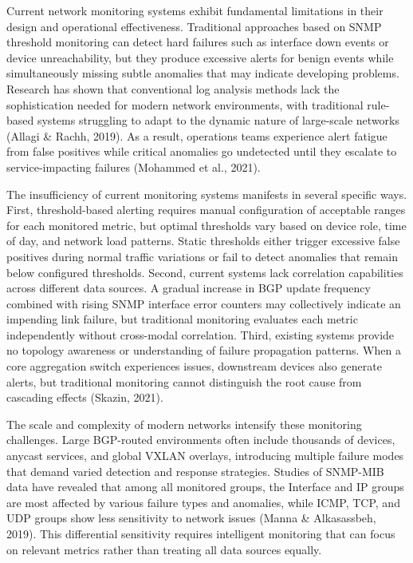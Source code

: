 \documentclass[11pt]{article}
\begin{document}
Current network monitoring systems exhibit fundamental limitations in their design and operational effectiveness. Traditional approaches based on SNMP threshold monitoring can detect hard failures such as interface down events or device unreachability, but they produce excessive alerts for benign events while simultaneously missing subtle anomalies that may indicate developing problems. Research has shown that conventional log analysis methods lack the sophistication needed for modern network environments, with traditional rule-based systems struggling to adapt to the dynamic nature of large-scale networks (Allagi \& Rachh, 2019). As a result, operations teams experience alert fatigue from false positives while critical anomalies go undetected until they escalate to service-impacting failures (Mohammed et al., 2021).

The insufficiency of current monitoring systems manifests in several specific ways. First, threshold-based alerting requires manual configuration of acceptable ranges for each monitored metric, but optimal thresholds vary based on device role, time of day, and network load patterns. Static thresholds either trigger excessive false positives during normal traffic variations or fail to detect anomalies that remain below configured thresholds. Second, current systems lack correlation capabilities across different data sources. A gradual increase in BGP update frequency combined with rising SNMP interface error counters may collectively indicate an impending link failure, but traditional monitoring evaluates each metric independently without cross-modal correlation. Third, existing systems provide no topology awareness or understanding of failure propagation patterns. When a core aggregation switch experiences issues, downstream devices also generate alerts, but traditional monitoring cannot distinguish the root cause from cascading effects (Skazin, 2021).

The scale and complexity of modern networks intensify these monitoring challenges. Large BGP-routed environments often include thousands of devices, anycast services, and global VXLAN overlays, introducing multiple failure modes that demand varied detection and response strategies. Studies of SNMP-MIB data have revealed that among all monitored groups, the Interface and IP groups are most affected by various failure types and anomalies, while ICMP, TCP, and UDP groups show less sensitivity to network issues (Manna \& Alkasassbeh, 2019). This differential sensitivity requires intelligent monitoring that can focus on relevant metrics rather than treating all data sources equally.
\end{document}
